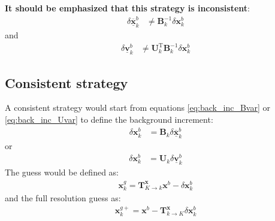 \documentclass[12pt]{scrartcl}
\begin{document}
\textbf{It should be emphasized that this strategy is inconsistent}:
\begin{align}
\delta \underline{\overline{\mathbf{x}}}^b_k & \ne \mathbf{B}^{-1}_k \delta \mathbf{x}^b_k
\end{align}
and
\begin{align}
\delta \underline{\mathbf{v}}^b_k & \ne \mathbf{U}_k^\mathrm{T} \mathbf{B}^{-1}_k \delta \mathbf{x}^b_k
\end{align}

\subsection{Consistent strategy}
A consistent strategy would start from equations \eqref{eq:back_inc_Bvar} or \eqref{eq:back_inc_Uvar} to define the background increment:
\begin{align}
\delta \mathbf{x}^b_k & = \mathbf{B}_k \delta \underline{\overline{\mathbf{x}}}^b_k
\end{align}
or
\begin{align}
\delta \mathbf{x}^b_k & = \mathbf{U}_k \delta \underline{\mathbf{v}}^b_k
\end{align}
The guess would be defined as:
\begin{align}
\mathbf{x}^g_k = \mathbf{T}^\mathbf{x}_{K \rightarrow k} \mathbf{x}^b - \delta \mathbf{x}^b_k
\end{align}
and the full resolution guess as:
\begin{align}
\mathbf{x}^{g+}_k = \mathbf{x}^b - \mathbf{T}^\mathbf{x}_{k \rightarrow K} \delta \mathbf{x}^b_k
\end{align}
\end{document}
